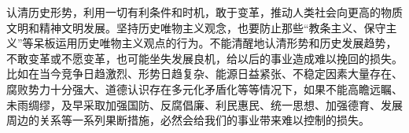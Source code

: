 \documentclass[openany,oneside]{book}
\theoremstyle{cthmstyle}
\theoremstyle{definition}
\theoremstyle{remark}
\begin{document}
认清历史形势，利用一切有利条件和时机，敢于变革，推动人类社会向更高的物质文明和精神文明发展。坚持历史唯物主义观念，也要防止那些“教条主义、保守主义”等呆板运用历史唯物主义观点的行为。不能清醒地认清形势和历史发展趋势，不敢变革或不愿变革，也可能坐失发展良机，给以后的事业造成难以挽回的损失。比如在当今竞争日趋激烈、形势日趋复杂、能源日益紧张、不稳定因素大量存在、腐败势力十分强大、道德认识存在多元化矛盾化等等情况下，如果不能高瞻远瞩、未雨绸缪，及早采取加强国防、反腐倡廉、利民惠民、统一思想、加强德育、发展周边的关系等一系列果断措施，必然会给我们的事业带来难以控制的损失。

%

\clearpage
{}
{}
\nocite{*} %

\end{document}
